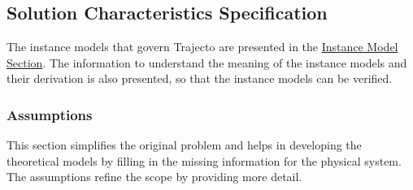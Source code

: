 \documentclass[12pt]{article}
\begin{document}
\subsection{Solution Characteristics Specification}
\label{Sec:SolCharSpec}
The instance models that govern Trajecto are presented in the \hyperref[Sec:IMs]{Instance Model Section}. The information to understand the meaning of the instance models and their derivation is also presented, so that the instance models can be verified.

\subsubsection{Assumptions}
\label{Sec:Assumps}
This section simplifies the original problem and helps in developing the theoretical models by filling in the missing information for the physical system. The assumptions refine the scope by providing more detail.
\end{document}
